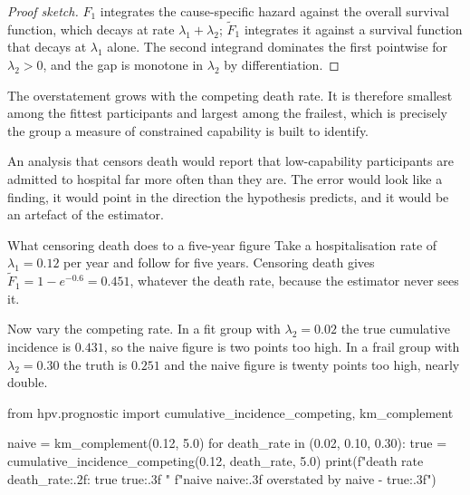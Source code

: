 \begin{proof}[Proof sketch]
$F_1$ integrates the cause-specific hazard against the overall survival
function, which decays at rate $\lambda_1+\lambda_2$; $\widetilde F_1$ integrates
it against a survival function that decays at $\lambda_1$ alone. The second
integrand dominates the first pointwise for $\lambda_2>0$, and the gap is
monotone in $\lambda_2$ by differentiation.
\end{proof}

\begin{reading}
The overstatement grows with the competing death rate. It is therefore
smallest among the fittest participants and largest among the frailest, which
is precisely the group a measure of constrained capability is built to
identify.

An analysis that censors death would report that low-capability participants
are admitted to hospital far more often than they are. The error would look
like a finding, it would point in the direction the hypothesis predicts, and it
would be an artefact of the estimator.
\end{reading}

\begin{workedexample}[competing]{What censoring death does to a five-year figure}
Take a hospitalisation rate of $\lambda_1=0.12$ per year and follow for five
years. Censoring death gives $\widetilde F_1=1-e^{-0.6}=0.451$, whatever the
death rate, because the estimator never sees it.

Now vary the competing rate. In a fit group with $\lambda_2=0.02$ the true
cumulative incidence is $0.431$, so the naive figure is two points too high. In
a frail group with $\lambda_2=0.30$ the truth is $0.251$ and the naive figure
is twenty points too high, nearly double.

\begin{wecode}[Python]
from hpv.prognostic import cumulative_incidence_competing, km_complement

naive = km_complement(0.12, 5.0)
for death_rate in (0.02, 0.10, 0.30):
    true = cumulative_incidence_competing(0.12, death_rate, 5.0)
    print(f"death rate {death_rate:.2f}: true {true:.3f}  "
          f"naive {naive:.3f}  overstated by {naive - true:.3f}")
\end{wecode}

\end{workedexample}

